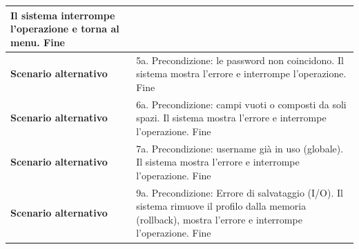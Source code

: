 \documentclass[12pt, a4paper, oneside]{report}
\begin{document}
\begin{tabularx}{\textwidth}{|l|X|}
    Il sistema interrompe l'operazione e torna al menu.\newline
    Fine \\ \hline
    \textbf{Scenario alternativo} & 
    5a. Precondizione: le password non coincidono.\newline
    Il sistema mostra l'errore e interrompe l'operazione.\newline
    Fine \\ \hline
    \textbf{Scenario alternativo} & 
    6a. Precondizione: campi vuoti o composti da soli spazi.\newline
    Il sistema mostra l'errore e interrompe l'operazione.\newline
    Fine \\ \hline
    \textbf{Scenario alternativo} & 
    7a. Precondizione: username già in uso (globale).\newline
    Il sistema mostra l'errore e interrompe l'operazione.\newline
    Fine \\ \hline 
    \textbf{Scenario alternativo} & 
    9a. Precondizione: Errore di salvataggio (I/O).\newline
    Il sistema rimuove il profilo dalla memoria (rollback), mostra l'errore e interrompe l'operazione.\newline
    Fine \\ \hline
\end{tabularx}

\renewcommand{\arraystretch}{1.4} 
\end{document}
